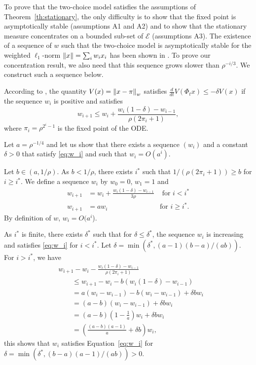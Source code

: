 \documentclass[sigconf]{acmart}
\newcommand\E{\mathcal{E}}
\newcommand\norm[1]{{\mathchoice{\bnorm{#1}}{\snorm{#1}}{\snorm{#1}}{\snorm{#1}}}}
\newcommand\bnorm[1]{\left\|#1\right\|}
\newcommand\snorm[1]{\|#1\|}
\newcommand\dt{\frac{d}{dt}}
\newcommand\p[1]{\left(#1\right)}
\begin{document}
To prove that the two-choice model satisfies the assumptions of
Theorem~\ref{th:stationary}, the only difficulty is to show that the
fixed point is asymptotically stable (assumptions A1 and A2) and to
show that the stationary measure concentrates on a bounded sub-set of
$\E$ (assumptions A3).  The existence of a sequence of $w$ such that
the two-choice model is asymptotically stable for the weighted
$\ell_1$-norm $\norm{x}=\sum_i w_i x_i$ has been shown in
\cite[Theorem~3.6]{mitzenmacher1996power}. To prove our concentration
result, we also need that this sequence grows slower than
$\rho^{-i/3}$. We construct such a sequence below.

According to \cite[Proof of Theorem~3.6]{mitzenmacher1996power}, the
quantity $V(x)=\norm{x-\pi}_w$ satisfies
$\dt V(\Phi_tx)\le -\delta V(x)$ if the sequence $w_i$ is positive and
satisfies
\begin{equation}
  \label{eq:w_i}
  w_{i+1} \le w_i + \frac{w_i(1-\delta) - w_{i-1}}{\rho
    (2\pi_i+1)},
\end{equation}
where $\pi_i=\rho^{2^i-1}$ is the fixed point of the ODE. 

Let $a=\rho^{-1/4}$ 
and let us show that there exists a sequence
$(w_i)$ and a constant $\delta>0$ that satisfy \eqref{eq:w_i} and such
that $w_i=O(a^i)$.

Let $b\in(a,1/\rho)$. As $b<1/\rho$, there exists $i^*$ such
that $1/(\rho (2\pi_i+1))\ge b$ for $i\ge i^*$. We define a
sequence $w_i$ by $w_0=0$, $w_1=1$ and
\begin{align*}
  w_{i+1} &= w_i+\frac{w_i(1-\delta) - w_{i-1}}{3\rho} 
  &\text{ for $i<i^*$}\\
  w_{i+1} &= aw_i  &\text{for $i\ge i^*$}. 
\end{align*}
By definition of $w$, $w_i=O(a^i$).

As $i^*$ is finite, there exists $\delta^*$ such that for
$\delta\le\delta^*$, the sequence $w_i$ is increasing and satisfies
\eqref{eq:w_i} for $i<i^*$. Let
$\delta=\min(\delta^*,(a-1)(b-a)/(ab))$.  For $i>i^*$, we have
\begin{align*}
  &w_{i+1} - w_i - \frac{w_i(1-\delta)-w_{i-1}}{\rho(2\pi_i+1)} \\
  &\qquad\le w_{i+1}-w_i - b (w_i(1-\delta)-w_{i-1})\\
  &\qquad= a(w_i-w_{i-1}) - b (w_i-w_{i-1}) + \delta b w_{i}\\
  &\qquad= (a-b)(w_i-w_{i-1}) + \delta b w_i \\
  &\qquad= (a-b)\p{1-\frac1a} w_i + \delta b w_i \\
  &\qquad= \p{\frac{(a-b)(a-1)}{a} + \delta b} w_i,
\end{align*}
this shows that $w_i$ satisfies Equation~\eqref{eq:w_i} for
$\delta=\min(\delta^*,(b-a)(a-1)/(ab))>0$.
\end{document}

